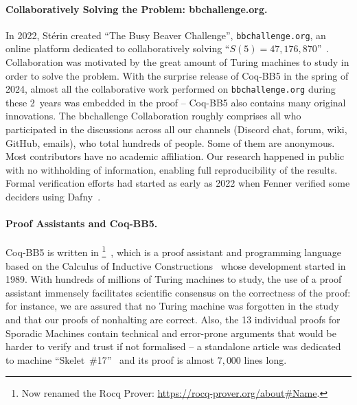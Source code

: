 \documentclass[sigconf,screen]{acmart}
\theoremstyle{definition} %
\numberwithin{equation}{section}
\theoremstyle{definition} %
\newcommand{\BBtheFifth}{47{,}176{,}870}
\newcommand{\CoqBB}{Coq-BB5\xspace}
\begin{document}
\paragraph{Collaboratively Solving the Problem: bbchallenge.org.}\hspace{0pt} In 2022, St\'erin created ``The Busy Beaver Challenge'', \texttt{bbchallenge.org}, an online platform dedicated to collaboratively solving ``$S(5)=\BBtheFifth$''~\cite{sterin_2022_14955828}. Collaboration was motivated by the great amount of Turing machines to study in order to solve the problem. With the surprise release of \CoqBB in the spring of 2024, almost all the collaborative work performed on \texttt{bbchallenge.org} during these 2~years was embedded in the \Coq proof -- \CoqBB also contains many original innovations. The bbchallenge Collaboration roughly comprises all who participated in the discussions across all our channels (Discord chat, forum, wiki, GitHub, emails), who total hundreds of people. Some of them are anonymous. Most contributors have no academic affiliation. Our research happened in public with no withholding of information, enabling full reproducibility of the results. Formal verification efforts had started as early as 2022 when Fenner verified some deciders using Dafny~\cite{dafny_fenner,Dafny}. 

\paragraph{Proof Assistants and \CoqBB.} \CoqBB is written in \Coq\footnote{Now renamed the Rocq Prover: \url{https://rocq-prover.org/about\#Name}.}~\cite{the_coq_development_team_2024_14542673}, which is a proof assistant and programming language based on the Calculus of Inductive Constructions~\cite{CoC} whose development started in 1989. With hundreds of millions of Turing machines to study, the use of a proof assistant immensely facilitates scientific consensus on the correctness of the proof: for instance, we are assured that no Turing machine was forgotten in the study and that our proofs of nonhalting are correct. Also, the 13 individual proofs for Sporadic Machines contain technical and error-prone arguments that would be harder to verify and trust if not formalised -- \eg a standalone article was dedicated to machine ``Skelet~\#17''~\cite{xu2024skelet17fifthbusy} and its \Coq proof is almost $7{,}000$ lines long.
\end{document}
